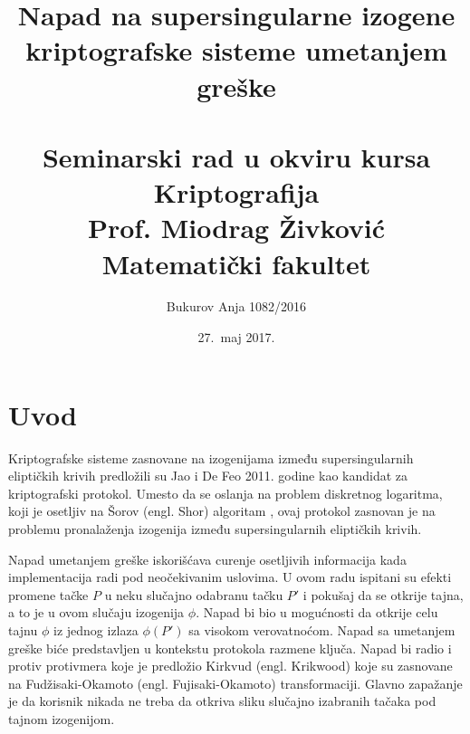 \documentclass[a4paper]{article}
\begin{document}
\title{Napad na supersingularne izogene kriptografske sisteme umetanjem greške\\ \small{~\\Seminarski rad u okviru kursa Kriptografija\\ Prof. Miodrag Živković\\Matematički fakultet}}

\author{Bukurov Anja 1082/2016}
\date{27.~maj 2017.}
\maketitle


\tableofcontents

\newpage

\section{Uvod}

Kriptografske sisteme zasnovane na izogenijama između supersingularnih eliptičkih krivih predložili su Jao i De Feo 2011. godine \cite{jao-de-feo} kao kandidat za kriptografski protokol. Umesto da se oslanja na problem diskretnog logaritma, koji je osetljiv na Šorov (engl. Shor) algoritam \cite{sho}, ovaj protokol zasnovan je na problemu pronalaženja izogenija između supersingularnih eliptičkih krivih.

Napad umetanjem greške iskorišćava curenje osetljivih informacija kada implementacija radi pod neočekivanim uslovima. U ovom radu ispitani su efekti promene tačke $P$ u neku slučajno odabranu tačku $P'$ i pokušaj da se otkrije tajna, a to je u ovom slučaju izogenija $\phi$. Napad bi bio u mogućnosti da otkrije celu tajnu $\phi$ iz jednog izlaza $\phi(P')$ sa visokom verovatnoćom. Napad sa umetanjem greške biće predstavljen u kontekstu protokola razmene ključa. Napad bi radio i protiv protivmera koje je predložio Kirkvud (engl. Krikwood)\cite{kirk} koje su zasnovane na Fudžisaki-Okamoto (engl. Fujisaki-Okamoto) transformaciji. Glavno zapažanje je da korisnik nikada ne treba da otkriva sliku slučajno izabranih tačaka pod tajnom izogenijom. 
\end{document}
